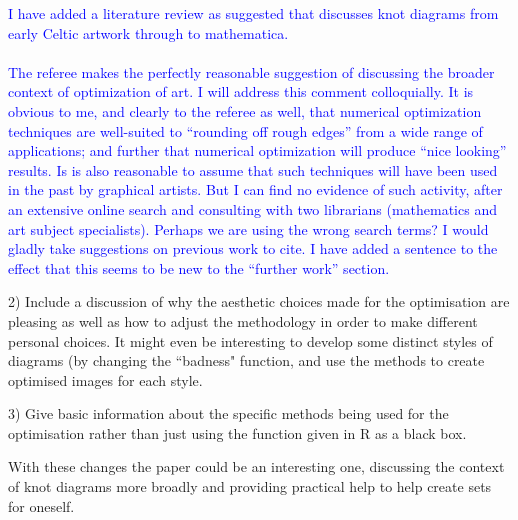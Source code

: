 \documentclass[12pt]{article}
\begin{document}
\textcolor{blue}{I have added a literature review as suggested that
  discusses knot diagrams from early Celtic artwork through to
  mathematica.\\ \\ The referee makes the perfectly reasonable
  suggestion of discussing the broader context of optimization of art.
  I will address this comment colloquially.  It is obvious to me, and
  clearly to the referee as well, that numerical optimization
  techniques are well-suited to ``rounding off rough edges'' from a
  wide range of applications; and further that numerical optimization
  will produce ``nice looking'' results.  Is is also reasonable to
  assume that such techniques will have been used in the past by
  graphical artists.  But I can find no evidence of such activity,
  after an extensive online search and consulting with two librarians
  (mathematics and art subject specialists).  Perhaps we are using the
  wrong search terms?  I would gladly take suggestions on previous
  work to cite.  I have added a sentence to the effect that this seems
  to be new to the ``further work'' section.}
  

2) Include a discussion of why the aesthetic choices made for the
optimisation are pleasing as well as how to adjust the methodology in
order to make different personal choices. It might even be interesting
to develop some distinct styles of diagrams (by changing the ``badness"
function, and use the methods to create optimised images for each
style.

3) Give basic information about the specific methods being used for
the optimisation rather than just using the function given in R as a
black box.

With these changes the paper could be an interesting one, discussing
the context of knot diagrams more broadly and providing practical help
to help create sets for oneself.
\end{document}

